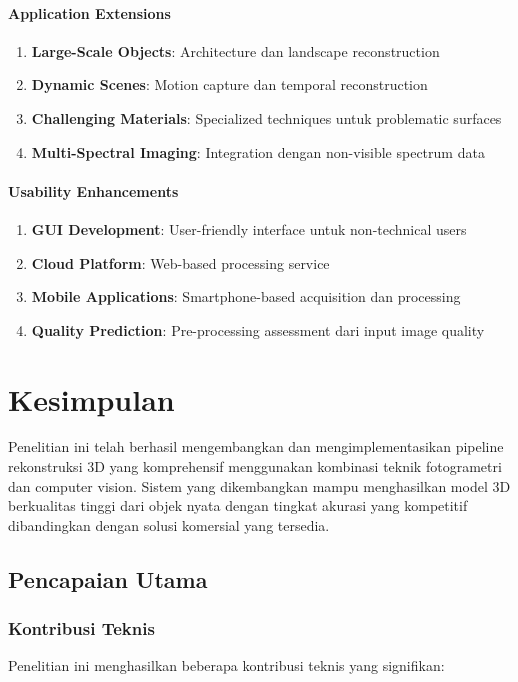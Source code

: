 \documentclass[12pt,a4paper]{article}
\begin{document}
\paragraph{Application Extensions}
\begin{enumerate}
    \item \textbf{Large-Scale Objects}: Architecture dan landscape reconstruction
    \item \textbf{Dynamic Scenes}: Motion capture dan temporal reconstruction
    \item \textbf{Challenging Materials}: Specialized techniques untuk problematic surfaces
    \item \textbf{Multi-Spectral Imaging}: Integration dengan non-visible spectrum data
\end{enumerate}

\paragraph{Usability Enhancements}
\begin{enumerate}
    \item \textbf{GUI Development}: User-friendly interface untuk non-technical users
    \item \textbf{Cloud Platform}: Web-based processing service
    \item \textbf{Mobile Applications}: Smartphone-based acquisition dan processing
    \item \textbf{Quality Prediction}: Pre-processing assessment dari input image quality
\end{enumerate}

\section{Kesimpulan}

Penelitian ini telah berhasil mengembangkan dan mengimplementasikan pipeline rekonstruksi 3D yang komprehensif menggunakan kombinasi teknik fotogrametri dan computer vision. Sistem yang dikembangkan mampu menghasilkan model 3D berkualitas tinggi dari objek nyata dengan tingkat akurasi yang kompetitif dibandingkan dengan solusi komersial yang tersedia.

\subsection{Pencapaian Utama}

\subsubsection{Kontribusi Teknis}
Penelitian ini menghasilkan beberapa kontribusi teknis yang signifikan:
\end{document}
